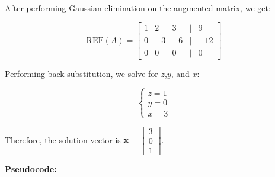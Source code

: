 \documentclass[
  letterpaper,
  DIV=11,
  numbers=noendperiod]{scrreprt}
\theoremstyle{plain}
\theoremstyle{definition}
\theoremstyle{remark}
\begin{document}
After performing Gaussian elimination on the augmented matrix, we get:

\[\text{REF}(A) = \begin{bmatrix} 1 & 2 & 3 & | & 9 \\ 0 & -3 & -6 & | & -12 \\ 0 & 0 & 0 & | & 0 \end{bmatrix}\]

Performing back substitution, we solve for \(z\),\(y\), and \(x\):

\[\begin{cases}
z = 1 \\
y = 0 \\
x = 3
\end{cases}\]

Therefore, the solution vector is
\(\mathbf{x} = \begin{bmatrix} 3 \\ 0 \\ 1 \end{bmatrix}\).

\textbf{Pseudocode:}
\end{document}

